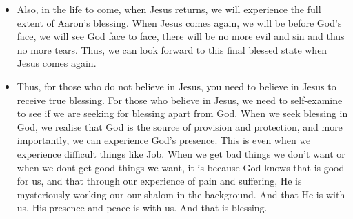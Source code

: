 \begin{itemize}
  \item{Also, in the life to come, when Jesus returns, we will experience the full extent of Aaron’s blessing. When Jesus comes again, we will be before God’s face, we will see God face to face, there will be no more evil and sin and thus no more tears. Thus, we can look forward to this final blessed state when Jesus comes again.}
  \item{Thus, for those who do not believe in Jesus, you need to believe in Jesus to receive true blessing. For those who believe in Jesus, we need to self-examine to see if we are seeking for blessing apart from God. When we seek blessing in God, we realise that God is the source of provision and protection, and more importantly, we can experience God’s presence. This is even when we experience difficult things like Job. When we get bad things we don’t want or when we dont get good things we want, it is because God knows that is good for us, and that through our experience of pain and suffering, He is mysteriously working our our shalom in the background. And that He is with us, His presence and peace is with us. And that is blessing.}
\end{itemize}